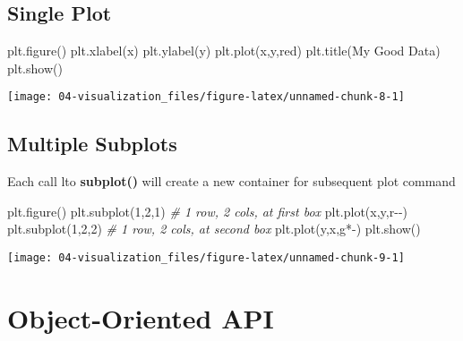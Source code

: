 \documentclass[
]{book}
\newenvironment{Shaded}{\begin{snugshade}}{\end{snugshade}}
\newcommand{\CommentTok}[1]{\textcolor[rgb]{0.37,0.37,0.37}{\textit{#1}}}
\newcommand{\DecValTok}[1]{\textcolor[rgb]{0.06,0.06,0.06}{#1}}
\newcommand{\NormalTok}[1]{#1}
\newcommand{\StringTok}[1]{\textcolor[rgb]{0.5,0.5,0.5}{#1}}
\begin{document}
\hypertarget{single-plot}{%
\subsection{Single Plot}\label{single-plot}}

\begin{Shaded}
\begin{Highlighting}[]
\NormalTok{plt.figure()}
\NormalTok{plt.xlabel(}\StringTok{\textquotesingle{}x\textquotesingle{}}\NormalTok{)}
\NormalTok{plt.ylabel(}\StringTok{\textquotesingle{}y\textquotesingle{}}\NormalTok{)}
\NormalTok{plt.plot(x,y,}\StringTok{\textquotesingle{}red\textquotesingle{}}\NormalTok{)}
\NormalTok{plt.title(}\StringTok{\textquotesingle{}My Good Data\textquotesingle{}}\NormalTok{)}
\NormalTok{plt.show()}
\end{Highlighting}
\end{Shaded}

\texttt{[image: 04-visualization\_files/figure-latex/unnamed-chunk-8-1]}

\hypertarget{multiple-subplots}{%
\subsection{Multiple Subplots}\label{multiple-subplots}}

Each call lto \textbf{subplot()} will create a new container for subsequent plot command

\begin{Shaded}
\begin{Highlighting}[]
\NormalTok{plt.figure()}
\NormalTok{plt.subplot(}\DecValTok{1}\NormalTok{,}\DecValTok{2}\NormalTok{,}\DecValTok{1}\NormalTok{) }\CommentTok{\# 1 row, 2 cols, at first box}
\NormalTok{plt.plot(x,y,}\StringTok{\textquotesingle{}r{-}{-}\textquotesingle{}}\NormalTok{)}
\NormalTok{plt.subplot(}\DecValTok{1}\NormalTok{,}\DecValTok{2}\NormalTok{,}\DecValTok{2}\NormalTok{) }\CommentTok{\# 1 row, 2 cols, at second box}
\NormalTok{plt.plot(y,x,}\StringTok{\textquotesingle{}g*{-}\textquotesingle{}}\NormalTok{)}
\NormalTok{plt.show()}
\end{Highlighting}
\end{Shaded}

\texttt{[image: 04-visualization\_files/figure-latex/unnamed-chunk-9-1]}

\hypertarget{object-oriented-api}{%
\section{Object-Oriented API}\label{object-oriented-api}}
\end{document}
